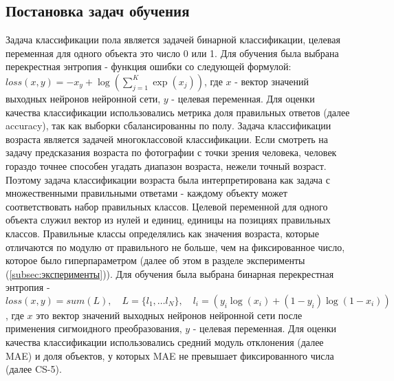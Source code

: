 \subsection{Постановка задач обучения}\label{subsec:постановка-задач-обучения}
Задача классификации пола является задачей бинарной классификации, целевая переменная для одного объекта это число 0 или 1.
Для обучения была выбрана перекрестная энтропия - функция ошибки со следующей формулой:
$loss(x, y) = -x_y + \log\left(\sum\limits_{j=1}^{K}\exp(x_j)\right)$, где $x$ - вектор значений выходных нейронов нейронной сети, $y$ - целевая переменная.
Для оценки качества классификации использовались метрика доля правильных ответов (далее accuracy), так как выборки сбалансированны по полу.
\newline
Задача классификации возраста является задачей многоклассовой классификации.
Если смотреть на задачу предсказания возраста по фотографии с точки зрения человека,
человек гораздо точнее способен угадать диапазон возраста, нежели точный возраст.
Поэтому задача классификации возраста была интерпретирована как задача с множественными правильными ответами -
каждому объекту может соответствовать набор правильных классов.
Целевой переменной для одного объекта служил вектор из нулей и единиц, единицы на позициях правильных классов.
Правильные классы определялись как значения возраста, которые отличаются по модулю от правильного не больше,
чем на фиксированное число, которое было гиперпараметром (далее об этом в разделе эксперименты (\ref{subsec:эксперименты})).
Для обучения была выбрана бинарная перекрестная энтропия -
$loss(x, y) = sum(L), \quad L = \{l_1, \dots l_N\}, \quad l_i = \left(y_i \log(x_i) + (1 - y_i) \log(1 - x_i)\right)$,
где $x$ это вектор значений выходных нейронов нейронной сети после применения сигмоидного преобразования,
$y$ - целевая переменная.
Для оценки качества классификации использовались средний модуль отклонения (далее MAE)
и доля объектов, у которых MAE не превышает фиксированного числа (далее CS-5).


